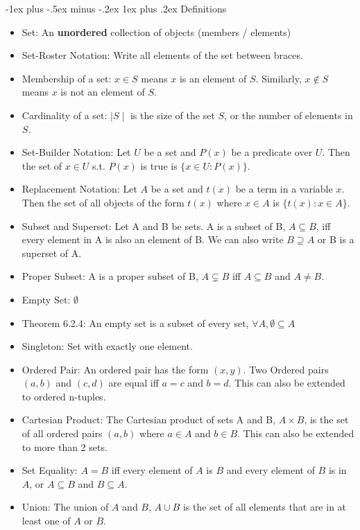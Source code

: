 \documentclass[10pt, portrait]{article}
\makeatletter
\renewcommand{\subsection}{\@startsection{subsection}{3}{0mm}%
                                {-1ex plus -.5ex minus -.2ex}%
                                {1ex plus .2ex}%
                                {\normalfont\small\bfseries}}%
\makeatother
\begin{document}
\begin{multicols*}{2}
\subsection{Definitions}
\begin{itemize}
    \item Set: An \textbf{unordered} collection of objects (members / elements)
    \item Set-Roster Notation: Write all elements of the set between braces.
    \item Membership of a set: $x \in S$ means $x$ is an element of $S$. Similarly, $x \notin S$ means $x$ is not an element of $S$.
    \item Cardinality of a set: $\mid S \mid$ is the size of the set $S$, or the number of elements in $S$.
    \item Set-Builder Notation: Let $U$ be a set and $P(x)$ be a predicate over $U$. Then the set of $x \in U$ s.t. $P(x)$ is true is $\{x \in U : P(x)\}$.
    \item Replacement Notation: Let $A$ be a set and $t(x)$ be a term in a variable $x$. Then the set of all objects of the form $t(x)$ where $x \in A$ is $\{t(x) : x \in A\}$.
    \item Subset and Superset: Let A and B be sets. A is a subset of B, $A \subseteq B$, iff every element in A is also an element of B. We can also write $B \supseteq A$ or B is a superset of A.
    \item Proper Subset: A is a proper subset of B, $A \subsetneq B$ iff $A \subseteq B$ and $A \neq B$.
    \item Empty Set: $\emptyset$
    \item Theorem 6.2.4: An empty set is a subset of every set, $\forall A, \emptyset \subseteq A$
    \item Singleton: Set with exactly one element.\
    \item Ordered Pair: An ordered pair has the form $(x, y)$. Two Ordered pairs $(a, b)$ and $(c, d)$ are equal iff $a = c$ and $b = d$. This can also be extended to ordered n-tuples.
    \item Cartesian Product: The Cartesian product of sets A and B, $A \times B$, is the set of all ordered pairs $(a, b)$ where $a \in A$ and $b \in B$. This can also be extended to more than 2 sets.
    \item Set Equality: $A = B$ iff every element of $A$ is $B$ and every element of $B$ is in $A$, or $A \subseteq B$ and $B \subseteq A$.
    \item Union: The union of $A$ and $B$, $A \cup B$ is the set of all elements that are in at least one of $A$ or $B$.

\end{itemize}
\end{multicols*}
\end{document}
